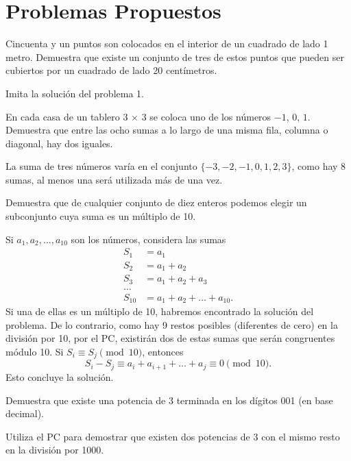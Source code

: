 \documentclass[11pt]{scrartcl}
\begin{document}

\section{Problemas Propuestos}
\begin{problem}
Cincuenta y un puntos son colocados en el interior de un cuadrado de lado 1 metro. Demuestra que existe un conjunto de tres de estos puntos que pueden ser cubiertos por un cuadrado de lado 20 centímetros.
\begin{hint}
Imita la solución del problema 1.
\end{hint}
\end{problem}

\begin{problem}
En cada casa de un tablero 3 $\times$ 3 se coloca uno de los números $-1$, $0$, $1$. Demuestra que entre las ocho sumas a lo largo de una misma fila, columna o diagonal, hay dos iguales.
\begin{hint}
La suma de tres números varía en el conjunto \(\{-3, -2, -1, 0, 1, 2, 3\}\), como hay 8 sumas, al menos una será utilizada más de una vez.
\end{hint}
\end{problem}

\begin{problem}
Demuestra que de cualquier conjunto de diez enteros podemos elegir un subconjunto cuya suma es un múltiplo de 10.
\begin{hint}
Si \(a_1, a_2, \ldots, a_{10}\) son los números, considera las sumas
\begin{align*}
S_1 &= a_1 \\
S_2 &= a_1 + a_2 \\
S_3 &= a_1 + a_2 + a_3 \\
\ldots \\
S_{10} &= a_1 + a_2 + \ldots + a_{10}.
\end{align*}
Si una de ellas es un múltiplo de 10, habremos encontrado la solución del problema. De lo contrario, como hay 9 restos posibles (diferentes de cero) en la división por 10, por el PC, existirán dos de estas sumas que serán congruentes módulo 10. Si \(S_i \equiv S_j \pmod{10}\), entonces
\[ S_i - S_j \equiv a_i + a_{i+1} + \ldots + a_j \equiv 0 \pmod{10}. \]
Esto concluye la solución.
\end{hint}
\end{problem}

\begin{problem}
Demuestra que existe una potencia de 3 terminada en los dígitos 001 (en base decimal).
\begin{hint}
Utiliza el PC para demostrar que existen dos potencias de 3 con el mismo resto en la división por 1000.
\end{hint}
\end{problem}
\end{document}
